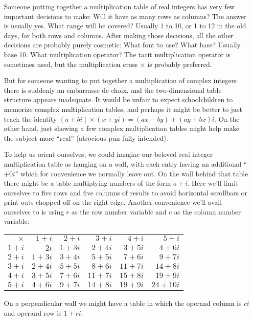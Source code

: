 \documentclass[12pt]{article}
\begin{document}
Someone putting together a multiplication table of real integers has very few important decisions to make: Will it have as many rows as columns? The answer is usually yes. What range will be covered? Usually 1 to 10, or 1 to 12 in the old days, for both rows and columns. After making those decisions, all the other decisions are probably purely cosmetic: What font to use? What base? Usually base 10. What multiplication operator? The tacit multiplication operator is sometimes used, but the multiplication cross $\times$ is probably preferred.

But for someone wanting to put together a multiplication of complex integers there is suddenly an embarrasse de choix, and the two-dimensional table structure appears inadequate. It would be unfair to expect schoolchildren to memorize complex multiplication tables, and perhaps it might be better to just teach the identity $(a + bi) \times (x + yi) = (ax - by) + (ay + bx)i$. On the other hand, just showing a few complex multiplication tables might help make the subject more ``real'' (atrocious pun fully intended).

To help us orient ourselves, we could imagine our beloved real integer multiplication table as hanging on a wall, with each entry having an additional ``$+ 0i$'' which for convenience we normally leave out. On the wall behind that table there might be a table multiplying numbers of the form $a + i$. Here we'll limit ourselves to five rows and five columns of results to avoid horizontal scrollbars or print-outs chopped off on the right edge. Another convenience we'll avail ourselves to is using $r$ as the row number variable and $c$ as the column number variable.

\begin{tabular}{|r|r|r|r|r|r|}
$\times$ & $1 + i$ & $2 + i$ & $3 + i$ & $4 + i$ & $5 + i$ \\
$1 + i$ & $2i$ & $1 + 3i$ & $2 + 4i$ & $3 + 5i$ & $4 + 6i$ \\
$2 + i$ & $1 + 3i$ & $3 + 4i$ & $5 + 5i$ & $7 + 6i$ & $9 + 7i$ \\
$3 + i$ & $2 + 4i$ & $5 + 5i$ & $8 + 6i$ & $11 + 7i$ & $14 + 8i$ \\
$4 + i$ & $3 + 5i$ & $7 + 6i$ & $11 + 7i$ & $15 + 8i$ & $19 + 9i$ \\
$5 + i$ & $4 + 6i$ & $9 + 7i$ & $14 + 8i$ & $19 + 9i$ & $24 + 10i$ \\
\end{tabular}

On a perpendicular wall we might have a table in which the operand column is $ci$ and operand row is $1 + ri$:
\end{document}
